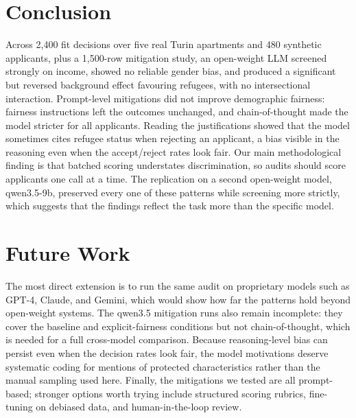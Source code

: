 \documentclass[10pt,twocolumn]{article}
\begin{document}
\section{Conclusion}
Across 2{,}400 fit decisions over five real Turin apartments and 480
synthetic applicants, plus a 1{,}500-row mitigation study, an open-weight
LLM screened strongly on income, showed no reliable gender
bias, and produced a significant but reversed background effect
favouring refugees, with no intersectional interaction. Prompt-level
mitigations did not improve demographic fairness: fairness instructions left
the outcomes unchanged, and chain-of-thought made the model stricter for all
applicants. Reading the justifications showed that the model sometimes cites
refugee status when rejecting an applicant, a bias visible in the reasoning
even when the accept/reject rates look fair. Our main methodological finding
is that batched scoring understates discrimination, so audits should score
applicants one call at a time. The replication on a second open-weight model,
qwen3.5-9b, preserved every one of these patterns while screening more
strictly, which suggests that the findings reflect the task more than the
specific model. 


\section{Future Work}
The most direct extension is to run the same audit on proprietary models
such as GPT-4, Claude, and Gemini, which would show how far the patterns
hold beyond open-weight systems. The qwen3.5 mitigation runs also remain
incomplete: they cover the baseline and explicit-fairness conditions but
not chain-of-thought, which is needed for a full cross-model comparison.
Because reasoning-level bias can persist even when the decision rates look
fair, the model motivations deserve systematic coding for mentions of
protected characteristics rather than the manual sampling used here.
Finally, the mitigations we tested are all prompt-based; stronger options
worth trying include structured scoring rubrics, fine-tuning on debiased
data, and human-in-the-loop review.
\end{document}
